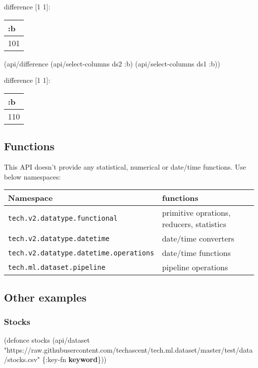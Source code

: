 \documentclass[]{article}
\newenvironment{Shaded}{\begin{snugshade}}{\end{snugshade}}
\newcommand{\KeywordTok}[1]{\textcolor[rgb]{0.13,0.29,0.53}{\textbf{#1}}}
\newcommand{\StringTok}[1]{\textcolor[rgb]{0.31,0.60,0.02}{#1}}
\newcommand{\FunctionTok}[1]{\textcolor[rgb]{0.00,0.00,0.00}{#1}}
\newcommand{\BuiltInTok}[1]{#1}
\newcommand{\AttributeTok}[1]{\textcolor[rgb]{0.77,0.63,0.00}{#1}}
\newcommand{\NormalTok}[1]{#1}
\begin{document}
difference {[}1 1{]}:

\begin{longtable}[]{@{}l@{}}
\toprule
:b\tabularnewline
\midrule
\endhead
101\tabularnewline
\bottomrule
\end{longtable}

\begin{Shaded}
\begin{Highlighting}[]
\NormalTok{(api/difference (api/select-columns ds2 }\AttributeTok{:b}\NormalTok{)}
\NormalTok{                (api/select-columns ds1 }\AttributeTok{:b}\NormalTok{))}
\end{Highlighting}
\end{Shaded}

difference {[}1 1{]}:

\begin{longtable}[]{@{}l@{}}
\toprule
:b\tabularnewline
\midrule
\endhead
110\tabularnewline
\bottomrule
\end{longtable}

\subsection{Functions}\label{functions}

This API doesn't provide any statistical, numerical or date/time
functions. Use below namespaces:

\begin{longtable}[]{@{}ll@{}}
\toprule
Namespace & functions\tabularnewline
\midrule
\endhead
\texttt{tech.v2.datatype.functional} & primitive oprations, reducers,
statistics\tabularnewline
\texttt{tech.v2.datatype.datetime} & date/time converters\tabularnewline
\texttt{tech.v2.datatype.datetime.operations} & date/time
functions\tabularnewline
\texttt{tech.ml.dataset.pipeline} & pipeline operations\tabularnewline
\bottomrule
\end{longtable}

\subsection{Other examples}\label{other-examples}

\subsubsection{Stocks}\label{stocks}

\begin{Shaded}
\begin{Highlighting}[]
\NormalTok{(}\BuiltInTok{defonce}\FunctionTok{ stocks }\NormalTok{(api/dataset }\StringTok{"https://raw.githubusercontent.com/techascent/tech.ml.dataset/master/test/data/stocks.csv"}\NormalTok{ \{}\AttributeTok{:key-fn} \KeywordTok{keyword}\NormalTok{\}))}
\end{Highlighting}
\end{Shaded}
\end{document}

